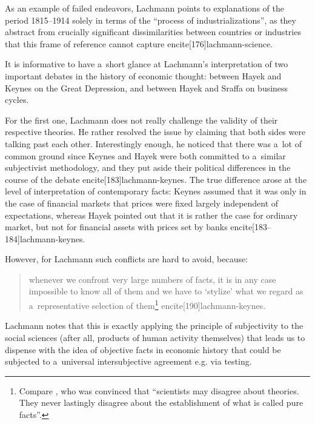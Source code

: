 {As an example of failed endeavors, Lachmann points to explanations of the period 1815--1914 solely in terms of the ``process of industrializations'', as they abstract from crucially significant dissimilarities between countries or industries that this frame of reference cannot capture encite[176]{lachmann-science}.



It is informative to have a~short glance at Lachmann's interpretation of two important debates in the history of economic thought: between Hayek and Keynes on the Great Depression, and between Hayek and Sraffa on business cycles.

For the first one, Lachmann does not really challenge the validity of their respective theories. He rather resolved the issue by claiming that both sides were talking past each other. Interestingly enough, he noticed that there was a~lot of common ground since Keynes and Hayek were both committed to a~similar subjectivist methodology, and they put aside their political differences in the course of the debate encite[183]{lachmann-keynes}. The true difference arose at the level of interpretation of contemporary facts: Keynes assumed that it was only in the case of financial markets that prices were fixed largely independent of expectations, whereas Hayek pointed out that it is rather the case for ordinary market, but not for financial assets with prices set by banks encite[183--184]{lachmann-keynes}.

However, for Lachmann such conflicts are hard to avoid, because:

\begin{quote}

whenever we confront very large numbers of facts, it is in any case impossible to know all of them and we have to `stylize' what we regard as a~representative selection of them\footnote{Compare \textcite[304]{mises-theory}, who was convinced that ``scientists may disagree about theories. They never lastingly disagree about the establishment of what is called pure facts''.} encite[190]{lachmann-keynes}.

\end{quote}

Lachmann notes that this is exactly applying the principle of subjectivity to the social sciences (after all, products of human activity themselves) that leads us to dispense with the idea of objective facts in economic history that could be subjected to a~universal intersubjective agreement e.g. via testing.



}
